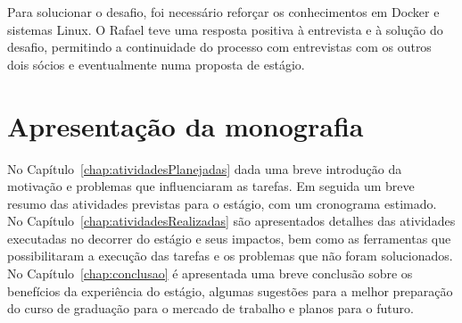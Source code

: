 Para solucionar o desafio, foi necessário reforçar os conhecimentos em Docker e sistemas Linux. O Rafael teve uma resposta positiva à entrevista e à solução do desafio, permitindo a continuidade do processo com entrevistas com os outros dois sócios e eventualmente numa proposta de estágio.


\section{Apresentação da monografia}

No Capítulo~\ref{chap:atividadesPlanejadas} dada uma breve introdução da motivação e problemas que influenciaram as tarefas. Em seguida um breve resumo das atividades previstas para o estágio, com um cronograma estimado.\\

No Capítulo~\ref{chap:atividadesRealizadas} são apresentados detalhes das atividades executadas no decorrer do estágio e seus impactos, bem como as ferramentas que possibilitaram a execução das tarefas e os problemas que não foram solucionados.\\

No Capítulo~\ref{chap:conclusao} é apresentada uma breve conclusão sobre os benefícios da experiência do estágio, algumas sugestões para a melhor preparação do curso de graduação para o mercado de trabalho e planos para o futuro.\\


